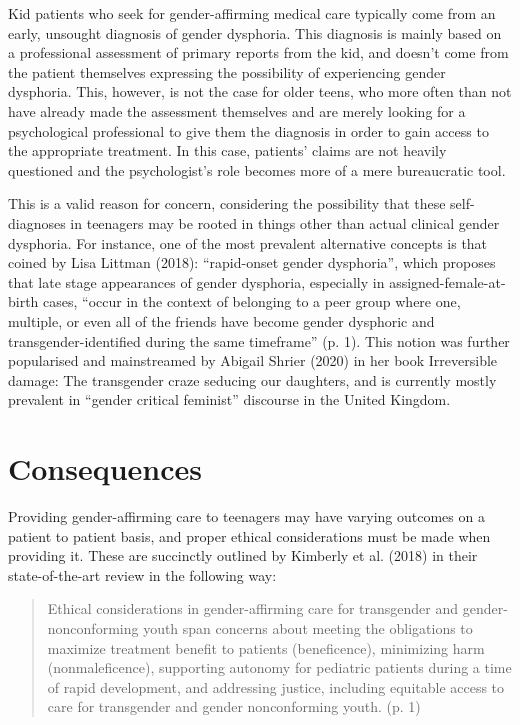 \documentclass{article}
\begin{document}
Kid patients who seek for gender-affirming medical care typically come from an early, unsought diagnosis of gender dysphoria. This diagnosis is mainly based on a professional assessment of primary reports from the kid, and doesn't come from the patient themselves expressing the possibility of experiencing gender dysphoria. This, however, is not the case for older teens, who more often than not have already made the assessment themselves and are merely looking for a psychological professional to give them the diagnosis in order to gain access to the appropriate treatment. In this case, patients' claims are not heavily questioned and the psychologist's role becomes more of a mere bureaucratic tool.\par

This is a valid reason for concern, considering the possibility that these self-diagnoses in teenagers may be rooted in things other than actual clinical gender dysphoria. For instance, one of the most prevalent alternative concepts is that coined by Lisa Littman (2018): “rapid-onset gender dysphoria”, which proposes that late stage appearances of gender dysphoria, especially in assigned-female-at-birth cases, “occur in the context of belonging to a peer group where one, multiple, or even all of the friends have become gender dysphoric and transgender-identified during the same timeframe” (p. 1). This notion was further popularised and mainstreamed by Abigail Shrier (2020) in her book Irreversible damage: The transgender craze seducing our daughters, and is currently mostly prevalent in “gender critical feminist” discourse in the United Kingdom.

\newpage

\section{Consequences}

Providing gender-affirming care to teenagers may have varying outcomes on a patient to patient basis, and proper ethical considerations must be made when providing it. These are succinctly outlined by Kimberly et al. (2018) in their state-of-the-art review in the following way: \par

\begin{quote}
    
\indent Ethical considerations in gender-affirming care for transgender and gender-nonconforming youth span concerns about meeting the obligations to maximize treatment benefit to patients (beneficence), minimizing harm (nonmaleficence), supporting autonomy for pediatric patients during a time of rapid development, and addressing justice, including equitable access to care for transgender and gender nonconforming youth. (p. 1)

\end{quote}\par
\end{document}
